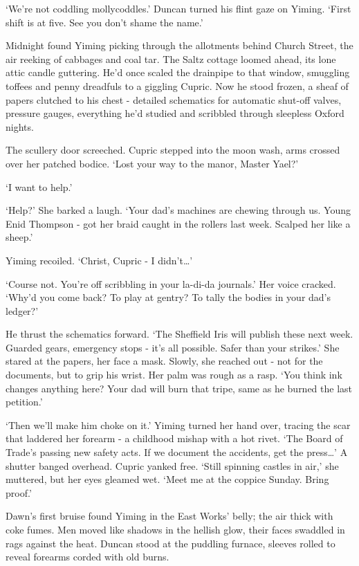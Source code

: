 `We're not coddling mollycoddles.' Duncan turned his flint gaze on Yiming. `First shift is at five. See you don't shame the name.'

Midnight found Yiming picking through the allotments behind Church Street, the air reeking of cabbages and coal tar. The Saltz cottage loomed ahead, its lone attic candle guttering. He'd once scaled the drainpipe to that window, smuggling toffees and penny dreadfuls to a giggling Cupric. Now he stood frozen, a sheaf of papers clutched to his chest - detailed schematics for automatic shut-off valves, pressure gauges, everything he'd studied and scribbled through sleepless Oxford nights.

The scullery door screeched. Cupric stepped into the moon wash, arms crossed over her patched bodice. `Lost your way to the manor, Master Yael?'

`I want to help.'

`Help?' She barked a laugh. `Your dad's machines are chewing through us. Young Enid Thompson - got her braid caught in the rollers last week. Scalped her like a sheep.'

Yiming recoiled. `Christ, Cupric - I didn't\dots'

`Course not. You're off scribbling in your la-di-da journals.' Her voice cracked. `Why'd you come back? To play at gentry? To tally the bodies in your dad's ledger?'

He thrust the schematics forward. `The Sheffield Iris will publish these next week. Guarded gears, emergency stops - it's all possible. Safer than your strikes.'
She stared at the papers, her face a mask. Slowly, she reached out - not for the documents, but to grip his wrist. Her palm was rough as a rasp. `You think ink changes anything here? Your dad will burn that tripe, same as he burned the last petition.'

`Then we'll make him choke on it.' Yiming turned her hand over, tracing the scar that laddered her forearm - a childhood mishap with a hot rivet. `The Board of Trade's passing new safety acts. If we document the accidents, get the press\dots'
A shutter banged overhead. Cupric yanked free. `Still spinning castles in air,' she muttered, but her eyes gleamed wet. `Meet me at the coppice Sunday. Bring proof.'

Dawn's first bruise found Yiming in the East Works' belly; the air thick with coke fumes. Men moved like shadows in the hellish glow, their faces swaddled in rags against the heat. Duncan stood at the puddling furnace, sleeves rolled to reveal forearms corded with old burns.

